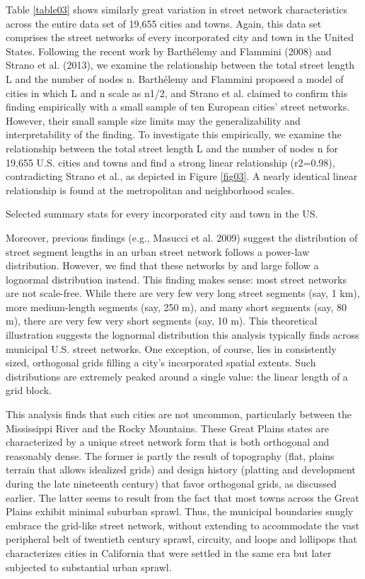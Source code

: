\documentclass[Afour,sageh,times]{sage/sagej}
\begin{document}
Table \ref{table03} shows similarly great variation in street network characteristics across the entire data set of 19,655 cities and towns. Again, this data set comprises the street networks of every incorporated city and town in the United States. Following the recent work by Barthélemy and Flammini (2008) and Strano et al. (2013), we examine the relationship between the total street length L and the number of nodes n. Barthélemy and Flammini proposed a model of cities in which L and n scale as n1/2, and Strano et al. claimed to confirm this finding empirically with a small sample of ten European cities' street networks. However, their small sample size limits may the generalizability and interpretability of the finding. To investigate this empirically, we examine the relationship between the total street length L and the number of nodes n for 19,655 U.S. cities and towns and find a strong linear relationship (r2=0.98), contradicting Strano et al., as depicted in Figure \ref{fig03}. A nearly identical linear relationship is found at the metropolitan and neighborhood scales.

\begin{table}
\caption{Selected summary stats for every incorporated city and town in the US.}
\label{table03}
\end{table}

Moreover, previous findings (e.g., Masucci et al. 2009) suggest the distribution of street segment lengths in an urban street network follows a power-law distribution. However, we find that these networks by and large follow a lognormal distribution instead. This finding makes sense: most street networks are not scale-free. While there are very few very long street segments (say, 1 km), more medium-length segments (say, 250 m), and many short segments (say, 80 m), there are very few very short segments (say, 10 m). This theoretical illustration suggests the lognormal distribution this analysis typically finds across municipal U.S. street networks. One exception, of course, lies in consistently sized, orthogonal grids filling a city's incorporated spatial extents. Such distributions are extremely peaked around a single value: the linear length of a grid block.

This analysis finds that such cities are not uncommon, particularly between the Mississippi River and the Rocky Mountains. These Great Plains states are characterized by a unique street network form that is both orthogonal and reasonably dense. The former is partly the result of topography (flat, plains terrain that allows idealized grids) and design history (platting and development during the late nineteenth century) that favor orthogonal grids, as discussed earlier. The latter seems to result from the fact that most towns across the Great Plains exhibit minimal suburban sprawl. Thus, the municipal boundaries snugly embrace the grid-like street network, without extending to accommodate the vast peripheral belt of twentieth century sprawl, circuity, and loops and lollipops that characterizes cities in California that were settled in the same era but later subjected to substantial urban sprawl.
\end{document}
